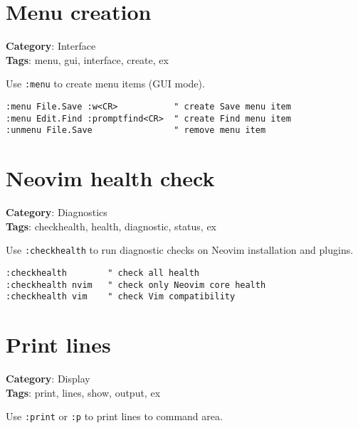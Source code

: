 {{{{{{\section{Menu creation}

\textbf{Category}: Interface\\ \textbf{Tags}: menu, gui, interface, create, ex
\vspace{0.5cm}

Use {\footnotesize \Verb§:menu§} to create menu items (GUI mode).

\begin{Exa*}{}
\begin{Verbatim}[fontsize=\footnotesize, breaklines, breakanywhere]
:menu File.Save :w<CR>           " create Save menu item
:menu Edit.Find :promptfind<CR>  " create Find menu item
:unmenu File.Save                " remove menu item
\end{Verbatim}
\end{Exa*}

\section{Neovim health check}

\textbf{Category}: Diagnostics\\ \textbf{Tags}: checkhealth, health, diagnostic, status, ex
\vspace{0.5cm}

Use {\footnotesize \Verb§:checkhealth§} to run diagnostic checks on Neovim installation and plugins.

\begin{Exa*}{}
\begin{Verbatim}[fontsize=\footnotesize, breaklines, breakanywhere]
:checkhealth        " check all health
:checkhealth nvim   " check only Neovim core health
:checkhealth vim    " check Vim compatibility
\end{Verbatim}
\end{Exa*}

\section{Print lines}

\textbf{Category}: Display\\ \textbf{Tags}: print, lines, show, output, ex
\vspace{0.5cm}

Use {\footnotesize \Verb§:print§} or {\footnotesize \Verb§:p§} to print lines to command area.

}}}}}}
